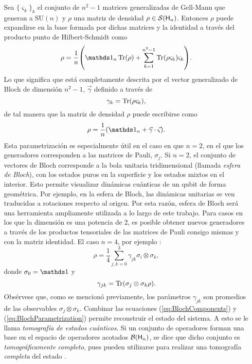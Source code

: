 Sea $\{\varsigma_{k}\}_{k}$ el conjunto de $n^{2}-1$ matrices generalizadas de Gell-Mann que generan a $\text{SU}(n)$ y $\rho$ una matriz de densidad $\rho\in\mathcal{S}({\sf H}_{n})$. Entonces $\rho$ puede expandirse en la base formada por dichas matrices y la identidad a través del producto punto de Hilbert-Schmidt como
\begin{equation}
    \rho=\frac{1}{n}\qty(\Id_{n}\Tr(\rho)+\sum_{k=1}^{n^{2}-1}\Tr(\rho\varsigma_{k})\varsigma_{k}).\nonumber
\end{equation}
Lo que significa que está completamente descrita por el vector generalizado de Bloch de dimensión $n^{2}-1$, $\vec{\gamma}$ definido a través de
\begin{equation}
    \gamma_{k}=\Tr(\rho\varsigma_{k}),\nonumber
\end{equation}
de tal manera que la matriz de densidad $\rho$ puede escribirse como
\begin{equation}\label{eq:BlochParametrization}
    \rho=\frac{1}{n}\qty(\Id_{n}+\vec{\gamma}\cdot\vec{\varsigma}).
\end{equation}
Esta parametrización es especialmente útil en el caso en que $n=2$, en el que los generadores corresponden a las matrices de Pauli, $\sigma_{j}$. Si $n=2$, el conjunto de vectores de Bloch corresponde a la bola unitaria tridimensional (llamada \textit{esfera de Bloch}), con los estados puros en la superficie y los estados mixtos en el interior. Esto permite visualizar dinámicas cuánticas de un qubit de forma geométrica. Por ejemplo, en la esfera de Bloch, las dinámicas unitarias se ven traducidas a rotaciones respecto al origen. Por esta razón, esfera de Bloch será una herramienta ampliamente utilizada a lo largo de este trabajo. Para casos en los que la dimensión es una potencia de $2$, es posible obtener nuevos generadores a través de los productos tensoriales de las matrices de Pauli consigo mismas y con la matriz identidad. El caso $n=4$, por ejemplo \cite{Chuang}:
\begin{equation}\label{eq:BlochParametrization4}
    \rho=\frac{1}{4}\sum_{j,k=0}^{3}\gamma_{jk}\sigma_{i}\otimes \sigma_{k},\nonumber
\end{equation}
donde $\sigma_{0}=\Id$ y 
\begin{equation}\label{eq:BlochComponents}
        \gamma_{jk}=\Tr(\sigma_{j}\otimes \sigma_{k}\rho).
\end{equation}
Obsérvese que, como se mencionó previamente, los parámetros $\gamma_{jk}$ son promedios de las observables $\sigma_{j} \otimes \sigma_{k}$. Combinar las ecuaciones (\ref{eq:BlochComponents}) y (\ref{eq:BlochParametrization}) permite reconstruir el estado del sistema. A esto se le llama \textit{tomografía de estados cuánticos}. Si un conjunto de operadores forman una base en el espacio de operadores acotados $\mathcal{B}({\sf H}_{n})$, se dice que dicho conjunto es \textit{tomográficamente completo}, pues pueden utilizarse para realizar una tomografía \textit{completa} del estado \cite{Chuang}.


